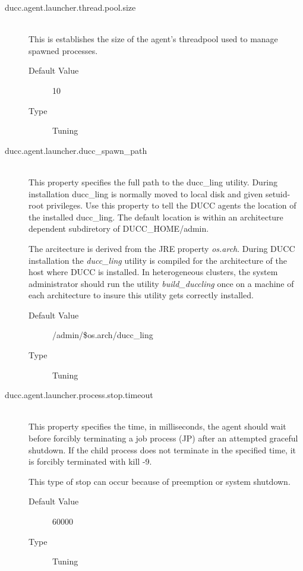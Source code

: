 \begin{description}
        \item[ducc.agent.launcher.thread.pool.size] \hfill \\
          This is establishes the size of the agent's threadpool used to manage spawned processes. 
          \begin{description}
            \item[Default Value] 10 
            \item[Type] Tuning 
          \end{description}
                    
        \item[ducc.agent.launcher.ducc\_spawn\_path] \hfill \\
          This property specifies the full path to the ducc\_ling utility. During installation ducc\_ling 
          is normally moved to local disk and given setuid-root privileges. Use this property to tell 
          the DUCC agents the location of the installed ducc\_ling.  The default location is within
          an architecture dependent subdiretory of DUCC\_HOME/admin.  

          The arcitecture is derived from
          the JRE property {\em os.arch}.  During DUCC installation the {\em ducc\_ling} utility is
          compiled for the architecture of the host where DUCC is installed.  In heterogeneous
          clusters, the system administrator should run the utility {\em build\_duccling} once on
          a machine of each architecture to insure this utility gets correctly installed.
          \begin{description}
            \item[Default Value] \ducchome/admin/\${os.arch}/ducc\_ling 
            \item[Type] Tuning             
          \end{description}
          
        \item[ducc.agent.launcher.process.stop.timeout] \hfill \\
          This property specifies the time, in milliseconds, the agent should wait before forcibly 
          terminating a job process (JP) after an attempted graceful shutdown. If the child process 
          does not terminate in the specified time, it is forcibly terminated with kill -9. 

          This type of stop can occur because of preemption or system shutdown. 
          \begin{description}
            \item[Default Value] 60000 
            \item[Type] Tuning 
          \end{description}
          

\end{description}
